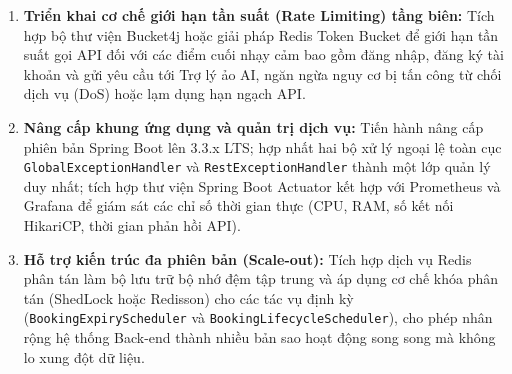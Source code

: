 \begin{enumerate}
    \item \textbf{Triển khai cơ chế giới hạn tần suất (Rate Limiting) tầng biên:} Tích hợp bộ thư viện Bucket4j hoặc giải pháp Redis Token Bucket để giới hạn tần suất gọi API đối với các điểm cuối nhạy cảm bao gồm đăng nhập, đăng ký tài khoản và gửi yêu cầu tới Trợ lý ảo AI, ngăn ngừa nguy cơ bị tấn công từ chối dịch vụ (DoS) hoặc lạm dụng hạn ngạch API.
    
    \item \textbf{Nâng cấp khung ứng dụng và quản trị dịch vụ:} Tiến hành nâng cấp phiên bản Spring Boot lên 3.3.x LTS; hợp nhất hai bộ xử lý ngoại lệ toàn cục \texttt{GlobalExceptionHandler} và \texttt{RestExceptionHandler} thành một lớp quản lý duy nhất; tích hợp thư viện Spring Boot Actuator kết hợp với Prometheus và Grafana để giám sát các chỉ số thời gian thực (CPU, RAM, số kết nối HikariCP, thời gian phản hồi API).
    
    \item \textbf{Hỗ trợ kiến trúc đa phiên bản (Scale-out):} Tích hợp dịch vụ Redis phân tán làm bộ lưu trữ bộ nhớ đệm tập trung và áp dụng cơ chế khóa phân tán (ShedLock hoặc Redisson) cho các tác vụ định kỳ (\texttt{BookingExpiryScheduler} và \texttt{BookingLifecycleScheduler}), cho phép nhân rộng hệ thống Back-end thành nhiều bản sao hoạt động song song mà không lo xung đột dữ liệu.
\end{enumerate}

